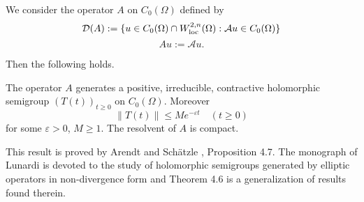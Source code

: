 We consider the operator $A$ on $C_0(\Omega)$ defined by
\[\mathcal{D}(A) := \{u \in C_0(\Omega) \cap W^{2,n}_{\text{loc}}(\Omega) : \mathcal{A}u \in C_0(\Omega)\}\]
\[Au := \mathcal{A}u.\]

Then the following holds.

\begin{theorem}[4.6]
The operator $A$ generates a positive, irreducible, contractive holomorphic semigroup $(T(t))_{t \geq 0}$ on $C_0(\Omega)$. Moreover
\[\|T(t)\| \leq Me^{-\varepsilon t} \quad (t \geq 0)\]
for some $\varepsilon > 0$, $M \geq 1$. The resolvent of $A$ is compact.
\end{theorem}

This result is proved by Arendt and Schätzle \cite{AS14}, Proposition 4.7. The monograph of Lunardi \cite{Lu95} is devoted to the study of holomorphic semigroups generated by elliptic operators in non-divergence form and Theorem 4.6 is a generalization of results found therein.

%
%
%
%
%
%
%
%
%
%
%
%
%
%